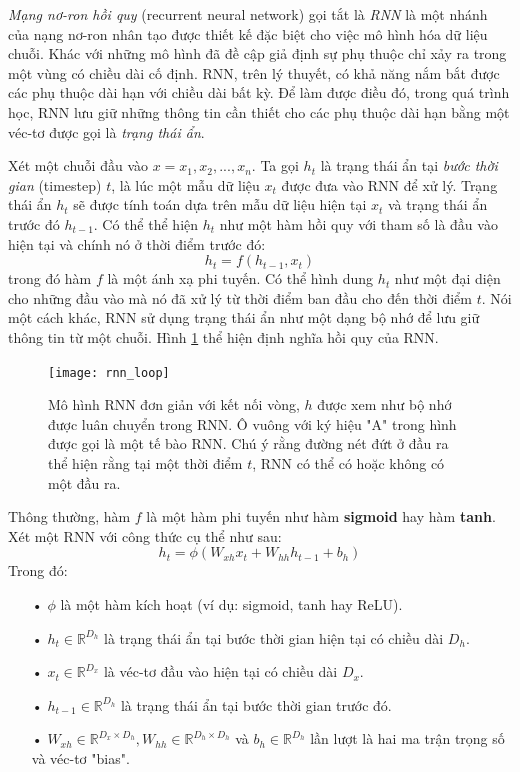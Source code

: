 \textit{Mạng nơ-ron hồi quy} (recurrent neural network) \cite{elman1990} gọi tắt là \textit{RNN} là một nhánh của nạng nơ-ron nhân tạo được thiết kế đặc biệt cho việc mô hình hóa dữ liệu chuỗi. Khác với những mô hình đã đề cập giả định sự phụ thuộc chỉ xảy ra trong một vùng có chiều dài cố định. RNN, trên lý thuyết, có khả năng nắm bắt được các phụ thuộc dài hạn với chiều dài bất kỳ. Để làm được điều đó, trong quá trình học, RNN lưu giữ những thông tin cần thiết cho các phụ thuộc dài hạn bằng một véc-tơ được gọi là \textit{trạng thái ẩn}.

Xét một chuỗi đầu vào $x={x_1,x_2,...,x_n}$. Ta gọi $h_t$ là trạng thái ẩn tại \textit{bước thời gian} (timestep) $t$, là lúc một mẫu dữ liệu $x_t$ được đưa vào RNN để xử lý. Trạng thái ẩn $h_t$ sẽ được tính toán dựa trên mẫu dữ liệu hiện tại $x_t$ và trạng thái ẩn trước đó $h_{t-1}$. Có thể thể hiện $h_t$ như một hàm hồi quy với tham số là đầu vào hiện tại và chính nó ở thời điểm trước đó:
\begin{equation} \label{basicRnnEquation}
h_t = f \left(h_{t-1}, x_t \right)
\end{equation}
trong đó hàm $f$ là một ánh xạ phi tuyến. Có thể hình dung $h_t$ như một đại diện cho những đầu vào mà nó đã xử lý từ thời điểm ban đầu cho đến thời điểm $t$. Nói một cách khác, RNN sử dụng trạng thái ẩn như một dạng bộ nhớ để lưu giữ thông tin từ một chuỗi. Hình \ref{fig_rnn_loop} thể hiện định nghĩa hồi quy của RNN.

\begin{figure}
	\centering
	\texttt{[image: rnn\_loop]}
	\caption[Mô hình RNN với kết nối vòng]{Mô hình RNN đơn giản với kết nối vòng, \textbf{$h$} được xem như bộ nhớ được luân chuyển trong RNN. Ô vuông với ký hiệu "A" trong hình được gọi là một tế bào RNN. Chú ý rằng đường nét đứt ở đầu ra thể hiện rằng tại một thời điểm $t$, RNN có thể có hoặc không có một đầu ra.}
	\label{fig_rnn_loop}
\end{figure}
Thông thường, hàm $f$ là một hàm phi tuyến như hàm \textbf{sigmoid} hay hàm \textbf{tanh}. Xét một RNN với công thức cụ thể như sau:
\begin{equation} \label{rnnWithTanh}
h_t = \phi \left(W_{xh} x_t + W_{hh}h_{t-1} + b_h \right)
\end{equation}
Trong đó:
\begin{itemize}
	\item[•] $\phi$ là một hàm kích hoạt (ví dụ: sigmoid, tanh hay ReLU).
	\item[•] $h_{t} \in \mathbb{R}^{D_h}$ là trạng thái ẩn tại bước thời gian hiện tại có chiều dài $D_h$.
	\item[•] $x_t \in \mathbb{R}^{D_x}$ là véc-tơ đầu vào hiện tại có chiều dài $D_x$.
	\item[•] $h_{t-1} \in \mathbb{R}^{D_h}$ là trạng thái ẩn tại bước thời gian trước đó.
	\item[•] $W_{xh} \in \mathbb{R}^{D_x \times D_h}, W_{hh} \in \mathbb{R}^{D_h \times D_h}$ và $b_h \in \mathbb{R}^{D_h}$ lần lượt là hai ma trận trọng số và véc-tơ "bias".
\end{itemize}

